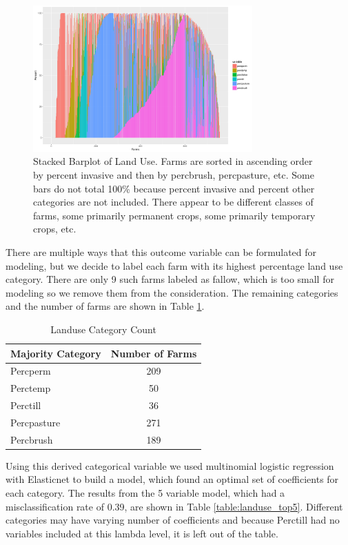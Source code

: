 \documentclass{article}
\begin{document}
\begin{figure}[h!]
\centering
\includegraphics[width = 0.75\textwidth]{landuse_barplot.pdf}
\caption{Stacked Barplot of Land Use. Farms are sorted in ascending order by percent invasive and then by percbrush, percpasture, etc. Some bars do not total 100\% because percent invasive and percent other categories are not included. There appear to be different classes of farms, some primarily permanent crops, some primarily temporary crops, etc. }
\label{figure:landuse_plot}
\end{figure}

There are multiple ways that this outcome variable can be formulated for modeling, but we decide to label each farm with its 
highest percentage land use category. There are only 9 such farms labeled as fallow, which is too small for modeling so we 
remove them from the consideration. The remaining categories and the number of farms are shown in Table \ref{table:landuse_cat}.

\begin{table}[h]
\centering
\begin{tabular}{lc}
Majority Category    & Number of Farms \\
\hline
Percperm    & 209             \\
Perctemp    & 50              \\
Perctill    & 36              \\
Percpasture & 271             \\
Percbrush   & 189            
\end{tabular}
\caption{Landuse Category Count}
\label{table:landuse_cat}
\end{table}  	

Using this derived categorical variable we used multinomial logistic regression with Elasticnet to build a model, which found an 
optimal set of coefficients for each category. The results from the 5 variable model, which had a misclassification rate of 0.39, are shown in Table \ref{table:landuse_top5}. Different categories may have varying number of coefficients and because Perctill had no variables included at this lambda level, it is left out of the table.
\end{document}
